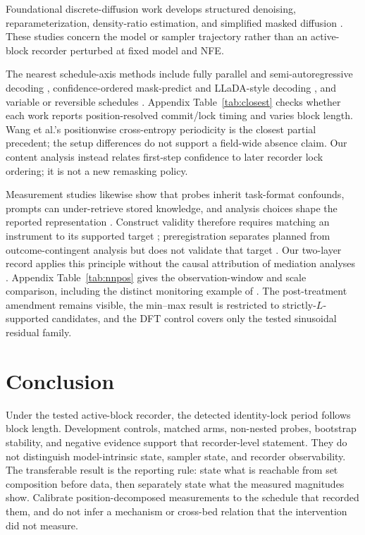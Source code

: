 \documentclass{article}
\begin{document}
Foundational discrete-diffusion work develops structured denoising,
reparameterization, density-ratio estimation, and simplified masked diffusion
\citep{austin2021structured,zheng2023reparameterized,lou2024discrete,shi2024simplified}.
These studies concern the model or sampler trajectory rather than an
active-block recorder perturbed at fixed model and NFE.

The nearest schedule-axis methods include fully parallel and
semi-autoregressive decoding \citep{gu2018nonautoregressive,wang2018semi},
confidence-ordered mask-predict and LLaDA-style decoding
\citep{ghazvininejad2019maskpredict,nie2025large,nie2026improved}, and variable
or reversible schedules \citep{li2025beyond,sun2026dystruct,wang2026reversible}.
Appendix Table~\ref{tab:closest} checks whether each work reports
position-resolved commit/lock timing and varies block length.  Wang et al.'s
positionwise cross-entropy periodicity is the closest partial precedent; the
setup differences do not support a field-wide absence claim.  Our content
analysis instead relates first-step confidence to later recorder lock ordering;
it is not a new remasking policy.

Measurement studies likewise show that probes inherit task-format confounds,
prompts can under-retrieve stored knowledge, and analysis choices shape the
reported representation \citep{sahoo2026linearprobes,jiang2020know,belinkov2018analysis}.
Construct validity therefore requires matching an instrument to its supported
target \citep{westreich2011table2fallacy}; preregistration separates planned
from outcome-contingent analysis but does not validate that target
\citep{nosek2018preregistration}.  Our two-layer record applies this principle
without the causal attribution of mediation analyses
\citep{stolfo2023mechanistic}.  Appendix Table~\ref{tab:nnpos} gives the
observation-window and scale comparison, including the distinct monitoring
example of \citet{feng2024monitoring}.  The post-treatment amendment remains
visible, the min--max result is restricted to strictly-$L$-supported candidates,
and the DFT control covers only the tested sinusoidal residual family.


\section{Conclusion}\label{sec:conclusion}

Under the tested active-block recorder, the detected identity-lock period follows
block length. Development controls, matched arms, non-nested probes, bootstrap
stability, and negative evidence support that recorder-level statement. They do
not distinguish model-intrinsic state, sampler state, and recorder observability.
The transferable result is the reporting rule: state what is reachable from set
composition before data, then separately state what the measured magnitudes show.
Calibrate position-decomposed measurements to the schedule that recorded them,
and do not infer a mechanism or cross-bed relation that the intervention did not
measure.
\end{document}
